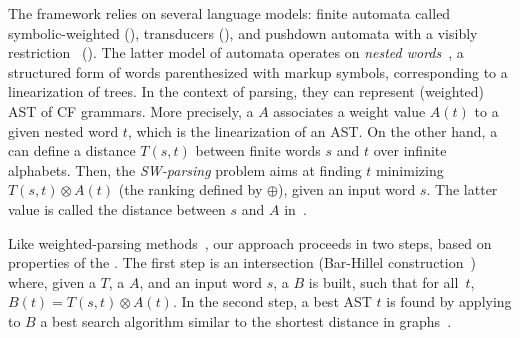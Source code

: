 %
%
The framework relies on several language models:
finite automata called symbolic-weighted (\SWA),
transducers (\SWT), and pushdown automata
with a visibly restriction~\cite{AlurMadhusudan09nested} (\SWVPA).
The latter model of automata operates on \emph{nested words}~\cite{AlurMadhusudan09nested},
a structured form of words parenthesized with markup symbols,
corresponding to a linearization of trees.
In the context of parsing, they can represent (weighted) AST of CF grammars.
More precisely, a \SWVPA $A$ associates a weight value $A(t)$ %
to a given nested word $t$, which is the linearization of an AST. %
%
On the other hand,
a \SWT can define a distance $T(s, t)$ between finite words $s$ and $t$
over infinite alphabets. %
Then, the \emph{SW-parsing} problem aims at %
finding $t$ minimizing
$T(s, t) \otimes A(t)$ (\wrt the ranking defined by $\oplus$), given an input word $s$.
The latter value is called the distance between $s$ and $A$ in~\cite{Mohri03EDWA}.
%

Like weighted-parsing
methods~\cite{Goodman99SemiringParsing,Nederhof03weightedParsing,MorbitzVogler19weighted-parsing},
our approach proceeds in two steps,
based on properties of the \swM.
The first step is an intersection
(Bar-Hillel construction~\cite{GruneJacobs08parsing})
where, given a \SWT $T$, a \SWVPA $A$, and an input word $s$,
a \SWVPA $B$ %
is built, such that for all~$t$,  $B(t) = T(s, t) \otimes A(t)$.%
In the second step, a best AST $t$ is found by applying to $B$ %
a best search algorithm similar to the shortest distance
in graphs~\cite{Mohri02semiring,Huang05kbest}.
%

